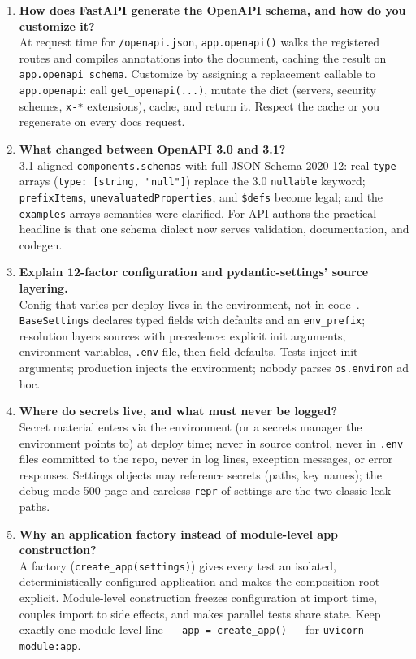 \begin{enumerate}[label=\textbf{Q\arabic*.}, leftmargin=1.3cm, itemsep=0.8em]
\item \textbf{How does FastAPI generate the OpenAPI schema, and how do you
customize it?}\\
At request time for \texttt{/openapi.json}, \texttt{app.openapi()} walks the
registered routes and compiles annotations into the document, caching the
result on \texttt{app.openapi\_schema}. Customize by assigning a replacement
callable to \texttt{app.openapi}: call \texttt{get\_openapi(...)}, mutate
the dict (servers, security schemes, \texttt{x-*} extensions), cache, and
return it. Respect the cache or you regenerate on every docs request.

\item \textbf{What changed between OpenAPI 3.0 and 3.1?}\\
3.1 aligned \texttt{components.schemas} with full JSON Schema 2020-12: real
\texttt{type} arrays (\texttt{type: [string, "null"]}) replace the 3.0
\texttt{nullable} keyword; \texttt{prefixItems}, \texttt{unevaluatedProperties},
and \texttt{\$defs} become legal; and the \texttt{examples} arrays semantics
were clarified. For API authors the practical headline is that one schema
dialect now serves validation, documentation, and codegen.

\item \textbf{Explain 12-factor configuration and pydantic-settings' source
layering.}\\
Config that varies per deploy lives in the environment, not in
code~\cite{twelvefactor}. \texttt{BaseSettings} declares typed fields with
defaults and an \texttt{env\_prefix}; resolution layers sources with
precedence: explicit init arguments, environment variables, \texttt{.env}
file, then field defaults. Tests inject init arguments; production injects
the environment; nobody parses \texttt{os.environ} ad hoc.

\item \textbf{Where do secrets live, and what must never be logged?}\\
Secret material enters via the environment (or a secrets manager the
environment points to) at deploy time; never in source control, never in
\texttt{.env} files committed to the repo, never in log lines, exception
messages, or error responses. Settings objects may reference secrets (paths,
key names); the debug-mode 500 page and careless \texttt{repr} of settings
are the two classic leak paths.

\item \textbf{Why an application factory instead of module-level app
construction?}\\
A factory (\texttt{create\_app(settings)}) gives every test an isolated,
deterministically configured application and makes the composition root
explicit. Module-level construction freezes configuration at import time,
couples import to side effects, and makes parallel tests share state. Keep
exactly one module-level line --- \texttt{app = create\_app()} --- for
\texttt{uvicorn module:app}.


\end{enumerate}
